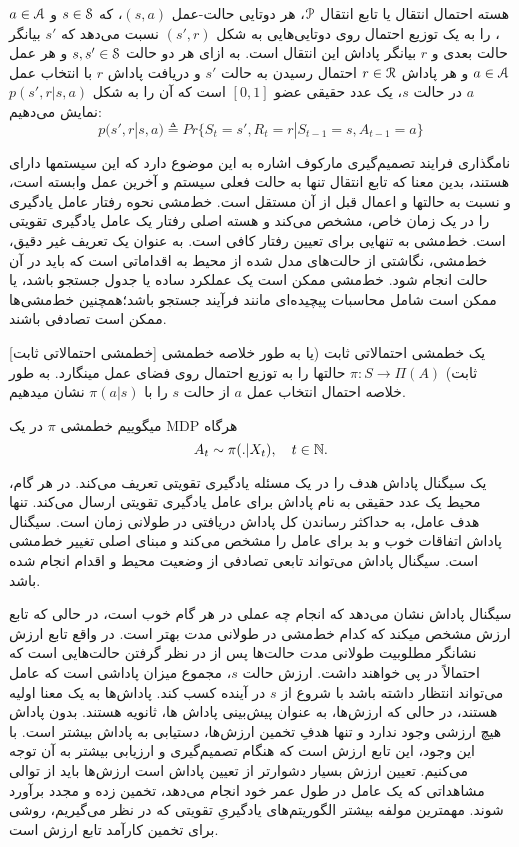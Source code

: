 
هسته احتمال انتقال یا تابع انتقال $\EuScript{P}$، هر دوتایی حالت-عمل
$(s,a)$، که 
$s \in \EuScript{S}$
و
$a \in \EuScript{A}$، را به یک توزیع احتمال روی دوتایی‌هایی به شکل 
$(s',r)$
نسبت می‌دهد که $s'$ بیانگر حالت بعدی و $r$ بیانگر پاداش این انتقال است. به ازای هر دو حالت 
$s,s' \in \EuScript{S}$
 و هر عمل 
 $a \in \EuScript{A}$
  و هر پاداش 
  $r \in \EuScript{R}$
  احتمال رسیدن به حالت $s'$ و دریافت پاداش $r$ با انتخاب عمل $a$ در حالت $s$، یک عدد حقیقی عضو $[0,1]$ است که آن را به شکل
$p(s',r|s,a)$
نمایش می‌دهیم:
$$p(s',r|s,a) \triangleq Pr\{S_t=s',R_t=r|S_{t-1}=s,A_{t-1}=a\}$$

نامگذاری فرایند تصمیم‌گیری مارکوف اشاره به این موضوع دارد که این سیستم\nf ها دارای  هستند، بدین معنا که تابع انتقال تنها به حالت فعلی سیستم و آخرین عمل وابسته است، و نسبت به حالت\nf ها و اعمال قبل از آن مستقل است.
خط‌مشی نحوه رفتار عامل یادگیری را در یک زمان خاص، مشخص می‌کند و هسته اصلی رفتار یک عامل یادگیری تقویتی است. خط‌مشی به تنهایی برای تعیین رفتار کافی است. به عنوان یک تعریف غیر دقیق، خط‌مشی، نگاشتی از حالت‌های مدل شده از محیط به اقداماتی است که باید در آن حالت انجام شود.
خط‌مشی ممکن است یک عملکرد ساده یا جدول جستجو باشد، یا ممکن است شامل محاسبات پیچیده‌ای مانند فرآیند جستجو باشد؛همچنین
خط‌مشی‌ها ممکن است تصادفی باشند.

[خط\nf مشی احتمالاتی ثابت]
یک خط\nf مشی احتمالاتی ثابت (یا به طور خلاصه خط\nf مشی ثابت) 
$\pi: S \to \Pi(A)$
حالت\nf ها را به توزیع احتمال روی فضای عمل می\nf نگارد.
به طور خلاصه احتمال انتخاب عمل $a$ از حالت $s$ را با
$\pi(a|s)$
نشان می\nf دهیم.

 می\nf گوییم خط\nf مشی $\pi$ در یک MDP  هرگاه
$$A_t \sim \pi(. |X_t),	 \quad t \in \mathbb{N}.$$


یک سیگنال پاداش هدف را در یک مسئله یادگیری تقویتی تعریف می‌کند. در هر گام، محیط یک عدد حقیقی به نام پاداش برای عامل یادگیری تقویتی ارسال می‌کند. تنها هدف عامل، به حداکثر رساندن کل پاداش دریافتی در طولانی زمان است. سیگنال پاداش اتفاقات خوب و بد برای عامل را مشخص می‌کند و مبنای اصلی تغییر خط‌مشی است.
سیگنال پاداش می‌تواند تابعی تصادفی از وضعیت محیط و اقدام انجام شده باشد.


 سیگنال پاداش نشان می‌دهد که انجام چه عملی در هر گام خوب است، در حالی که تابع ارزش مشخص می\nf کند که کدام خط‌مشی در طولانی مدت بهتر است. در واقع تابع ارزش نشانگر مطلوبیت طولانی مدت حالت‌ها پس از در نظر گرفتن حالت‌هایی است که احتمالاً در پی خواهند داشت.
ارزش حالت $s$، مجموع میزان پاداشی است که عامل می‌تواند انتظار داشته باشد با شروع از $s$ در آینده کسب کند.
پاداش‌ها به یک معنا اولیه هستند، در حالی که ارزش‌ها، به عنوان پیش‌بینی پاداش ها، ثانویه هستند. بدون پاداش هیچ ارزشی وجود ندارد و تنها هدفِ تخمین ارزش‌ها، دستیابی به پاداش بیشتر است. با این وجود، این تابع ارزش است که هنگام تصمیم‌گیری و ارزیابی بیشتر به آن توجه می‌کنیم.
تعیین ارزش‌ بسیار دشوارتر از تعیین پاداش است
ارزش‌ها باید از توالی مشاهداتی که یک عامل در طول عمر خود انجام می‌دهد، تخمین زده و مجدد برآورد شوند.
مهمترین مولفه بیشتر الگوریتم‌های یادگیریِ تقویتی که در نظر می‌گیریم، روشی برای تخمین کارآمد تابع ارزش است.

